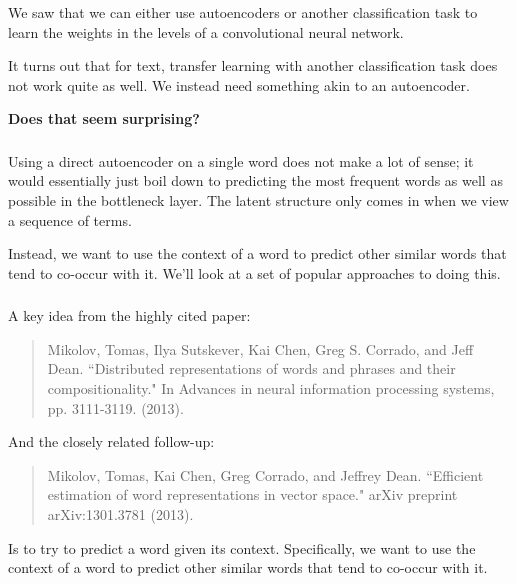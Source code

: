 \documentclass[xetex,mathserif,serif,aspectratio=169]{beamer}
\begin{document}
\begin{frame}[fragile] \frametitle{} \oldB \small


We saw that we can either use autoencoders or another classification
task to learn the weights in the levels of a convolutional neural
network.

It turns out that for text, transfer learning with another
classification task does not work quite as well. We instead need
something akin to an autoencoder.

\pause \textbf{Does that seem surprising?}

\end{frame}

\begin{frame}[fragile] \frametitle{} \oldB \small


Using a direct autoencoder on a single word does not make a lot of sense;
it would essentially just boil down to predicting the most frequent words
as well as possible in the bottleneck layer. The latent structure only
comes in when we view a sequence of terms.

Instead, we want to use the context of a word to predict other similar
words that tend to co-occur with it. We'll look at a set of popular
approaches to doing this.

\end{frame}

\begin{frame}[fragile] \frametitle{} \oldB \small


A key idea from the highly cited paper:
\begin{quote}
Mikolov, Tomas, Ilya Sutskever, Kai Chen, Greg S. Corrado, and
Jeff Dean. ``Distributed representations of words and phrases
and their compositionality." In Advances in neural information
processing systems, pp. 3111-3119. (2013).
\end{quote}
And the closely related follow-up:
\begin{quote}
Mikolov, Tomas, Kai Chen, Greg Corrado, and Jeffrey Dean.
``Efficient estimation of word representations in vector space."
arXiv preprint arXiv:1301.3781 (2013).
\end{quote}
Is to try to predict a word given its context. Specifically, we
want to use the context of a word to predict other similar
words that tend to co-occur with it.

\end{frame}
\end{document}
